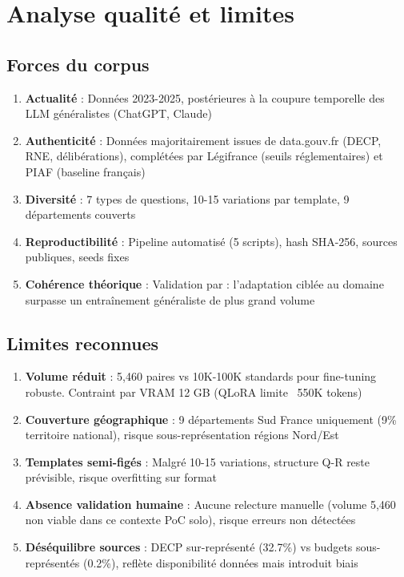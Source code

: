 \section{Analyse qualité et limites}

\subsection{Forces du corpus}

\begin{enumerate}
    \item \textbf{Actualité} : Données 2023-2025, postérieures à la coupure temporelle des LLM généralistes (ChatGPT, Claude)
    
    \item \textbf{Authenticité} : Données majoritairement issues de data.gouv.fr (DECP, RNE, délibérations), complétées par Légifrance (seuils réglementaires) et PIAF (baseline français)
    
    \item \textbf{Diversité} : 7 types de questions, 10-15 variations par template, 9 départements couverts
    
    \item \textbf{Reproductibilité} : Pipeline automatisé (5 scripts), hash SHA-256, sources publiques, seeds fixes
    
    \item \textbf{Cohérence théorique} : Validation par \citet{gururangan2020dont} : l'adaptation ciblée au domaine surpasse un entraînement généraliste de plus grand volume
\end{enumerate}

\subsection{Limites reconnues}

\begin{enumerate}
    \item \textbf{Volume réduit} : 5,460 paires vs 10K-100K standards pour fine-tuning robuste. Contraint par VRAM 12 GB (QLoRA limite ~550K tokens)
    
    \item \textbf{Couverture géographique} : 9 départements Sud France uniquement (9\% territoire national), risque sous-représentation régions Nord/Est
    
    \item \textbf{Templates semi-figés} : Malgré 10-15 variations, structure Q-R reste prévisible, risque overfitting sur format
    
    \item \textbf{Absence validation humaine} : Aucune relecture manuelle (volume 5{,}460 non viable dans ce contexte PoC solo), risque erreurs non détectées
    
    \item \textbf{Déséquilibre sources} : DECP sur-représenté (32.7\%) vs budgets sous-représentés (0.2\%), reflète disponibilité données mais introduit biais
\end{enumerate}

